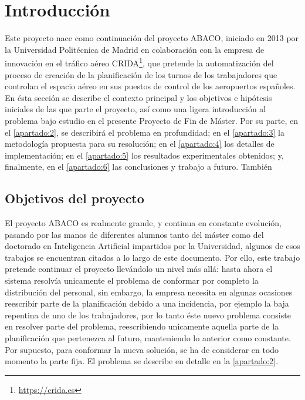 \graphicspath{{capitulos/Capitulo1-Introduccion/recursos/}}


\section{Introducción}

Este proyecto nace como continuación del proyecto ABACO, iniciado en 2013 por la Universidad Politécnica de Madrid en
colaboración con la empresa de innovación en el tráfico aéreo CRIDA\footnote{\url{https://crida.es}}, que pretende la
automatización del proceso de creación de la planificación de los turnos de los trabajadores que controlan el espacio 
aéreo en sus puestos de control de los aeropuertos españoles.
\\

En ésta sección se describe el contexto principal y los objetivos e hipótesis iniciales de las que parte el proyecto, 
así como una ligera introducción al problema bajo estudio en el presente Proyecto de Fin de Máster. Por su parte, en el 
\autoref{apartado:2}, se describirá el problema en profundidad; en el \autoref{apartado:3}
la metodología propuesta para su resolución; en el \autoref{apartado:4} los detalles de implementación;
en el \autoref{apartado:5} los resultados experimentales obtenidos; y, finalmente, en el \autoref{apartado:6} las 
conclusiones y trabajo a futuro. También  %

\subsection{Objetivos del proyecto}
\label{sec:Objectivos}
El proyecto \gls{ABACO} es realmente grande, y continua en constante evolución, pasando por las manos de 
diferentes alumnos tanto del máster como del doctorado en Inteligencia Artificial impartidos por la Universidad, algunos de esos trabajos se encuentran citados a lo largo de este documento. 
Por ello, este trabajo pretende continuar el proyecto llevándolo un nivel más allá: hasta ahora el sistema resolvía unicamente el problema de conformar por completo la distribución del personal, sin embargo, la empresa necesita en algunas ocasiones reescribir parte de la planificación debido a una incidencia, por ejemplo la baja repentina de uno de los trabajadores, por lo tanto éste nuevo problema consiste en resolver parte del problema, reescribiendo unicamente aquella parte de la planificación que pertenezca al futuro, manteniendo lo anterior como constante. 
Por supuesto, para conformar la nueva solución, se ha de considerar en todo momento la parte fija. El problema se describe en detalle en la \autoref{apartado:2}.
\\

